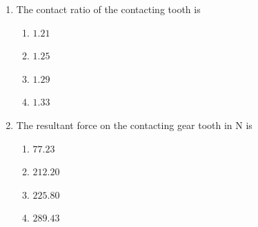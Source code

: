 \documentclass[journal,12pt,twocolumn]{IEEEtran}
\theoremstyle{remark}
\begin{document}
\begin{enumerate}[start=69]
    \item The contact ratio of the contacting tooth is
    \begin{enumerate}
        \item $1.21$
        \item $1.25$
        \item $1.29$
        \item $1.33$
    \end{enumerate}
    
    \item The resultant force on the contacting gear tooth in N is
    \begin{enumerate}
        \item $77.23$
        \item $212.20$
        \item $225.80$
        \item $289.43$
    \end{enumerate}

\end{enumerate}
\end{document}
